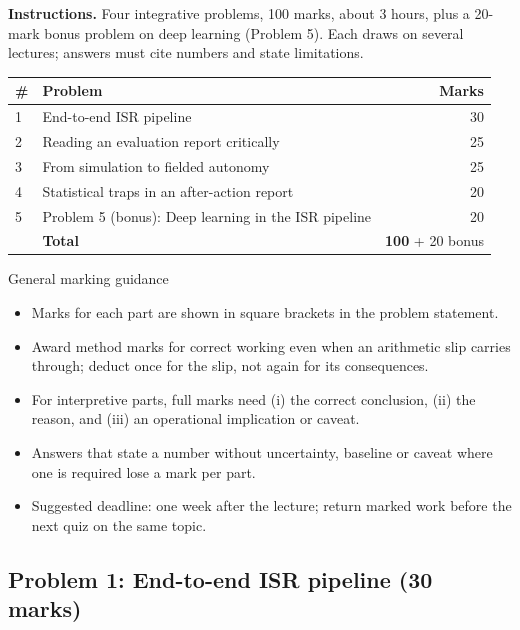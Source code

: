\documentclass[11pt]{article}
\begin{document}
\textbf{Instructions.} Four integrative problems, 100 marks, about 3 hours, plus a 20-mark bonus problem on deep learning (Problem 5). Each draws on several lectures; answers must cite numbers and state limitations.

\begin{center}\small\renewcommand{\arraystretch}{1.25}\begin{tabularx}{0.85\textwidth}{@{}l X r@{}}\toprule\textbf{\#} & \textbf{Problem} & \textbf{Marks}\\\midrule1 & End-to-end ISR pipeline & 30\\
2 & Reading an evaluation report critically & 25\\
3 & From simulation to fielded autonomy & 25\\
4 & Statistical traps in an after-action report & 20\\
5 & Problem 5 (bonus): Deep learning in the ISR pipeline & 20\\\midrule & \textbf{Total} & \textbf{100} + 20 bonus\\\bottomrule\end{tabularx}\end{center}

\begin{instr}{General marking guidance}\begin{itemize}
\item Marks for each part are shown in square brackets in the problem statement.
\item Award method marks for correct working even when an arithmetic slip carries through; deduct once for the slip, not again for its consequences.
\item For interpretive parts, full marks need (i) the correct conclusion, (ii) the reason, and (iii) an operational implication or caveat.
\item Answers that state a number without uncertainty, baseline or caveat where one is required lose a mark per part.
\item Suggested deadline: one week after the lecture; return marked work before the next quiz on the same topic.
\end{itemize}\end{instr}

\subsection{Problem 1: End-to-end ISR pipeline \normalfont\small\color{GreyN}(30 marks)}
\end{document}

